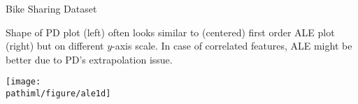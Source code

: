 \documentclass[11pt,compress,t,notes=noshow, aspectratio=169, xcolor=table]{beamer}
\newcommand{\pathiml}{../../slides/03_feature-effects/}
\begin{document}
\begin{frame}{Bike Sharing Dataset}

Shape of PD plot (left) often looks similar to (centered) first order ALE plot (right) but on different $y$-axis scale.
In case of correlated features, ALE might be better due to PD's extrapolation issue.


\begin{center}
\texttt{[image: \\pathiml/figure/ale1d]}
\end{center}


\end{frame}









\end{document}
